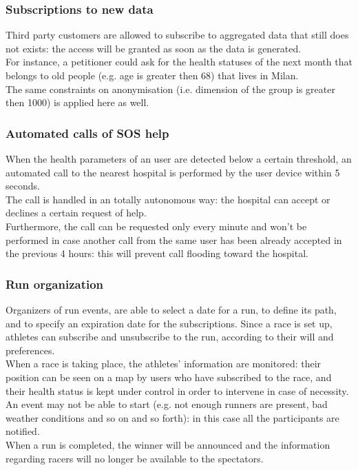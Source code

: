 \subsubsection{Subscriptions to new data}
Third party customers are allowed to subscribe to aggregated data that still does not exists: the access will be granted as soon as the data is generated.\\
For instance, a petitioner could ask for the health statuses of the next month that belongs to old people (e.g. age is greater then 68) that lives in Milan. \\
The same constraints on anonymisation (i.e. dimension of the group is greater then 1000) is applied here as well.

\subsubsection{Automated calls of SOS help}
When the health parameters of an user are detected below a certain threshold, an automated call to the nearest hospital is performed by the user device within 5 seconds. \\
The call is handled in an totally autonomous way: the hospital can accept or declines a certain request of help. \\  
Furthermore, the call can be requested only every minute and won't be performed in case another call from the same user has been already accepted in the previous 4 hours: this will prevent call flooding toward the hospital. 

\subsubsection{Run organization}
Organizers of run events, are able to select a date for a run, to define its path, and to specify an expiration date for the subscriptions. 
Since a race is set up, athletes can subscribe and unsubscribe to the run, according to their will and preferences. \\
When a race is taking place, the athletes' information are monitored: their position can be seen on a map by users who have subscribed to the race, and their health status is kept under control in order to intervene in case of necessity. \\
An event may not be able to start (e.g. not enough runners are present, bad weather conditions and so on and so forth): in this case all the participants are notified. \\
When a run is completed, the winner will be announced and the information regarding racers will no longer be available to the spectators.  
